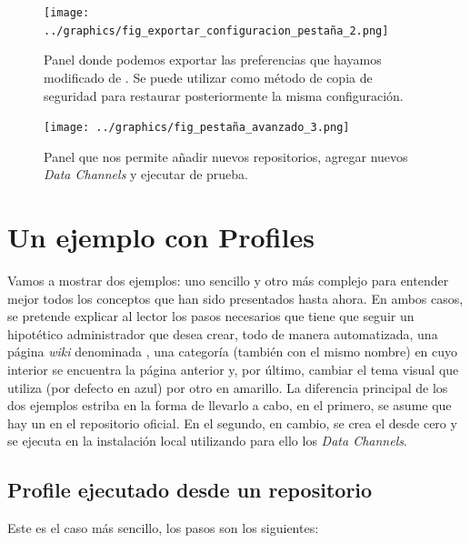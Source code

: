 \begin{figure}
\centering
\texttt{[image: ../graphics/fig\_exportar\_configuracion\_pestaña\_2.png]}
\caption{Panel donde podemos exportar las preferencias que hayamos modificado de \tiki{}. Se puede utilizar como método de copia de seguridad para restaurar posteriormente la misma configuración.}\label{fig:exportar_configuracion_pestaña_2}
\end{figure}

\begin{figure}[H]
\centering
\texttt{[image: ../graphics/fig\_pestaña\_avanzado\_3.png]}
\caption{Panel que nos permite añadir nuevos repositorios, agregar nuevos \textit{Data Channels} y ejecutar \profiles{} de prueba.}\label{fig:pestaña_avanzado_3}
\end{figure}

\section{Un ejemplo con Profiles}

Vamos a mostrar dos ejemplos: uno sencillo y otro más complejo para entender mejor todos los conceptos que han sido presentados hasta ahora. En ambos casos, se pretende explicar al lector los pasos necesarios que tiene que seguir un hipotético administrador que desea crear, todo de manera automatizada, una página \textit{wiki} denominada , una categoría (también con el mismo nombre) en cuyo interior se encuentra la página anterior y, por último, cambiar el tema visual que utiliza \tiki{} (por defecto en azul) por otro en amarillo. La diferencia principal de los dos ejemplos estriba en la forma de llevarlo a cabo, en el primero, se asume que hay un \profile{} en el repositorio oficial. En el segundo, en cambio, se crea el \profile{} desde cero y se ejecuta en la instalación local utilizando para ello los \textit{Data Channels}.

\subsection{Profile ejecutado desde un repositorio}

Este es el caso más sencillo, los pasos son los siguientes:

